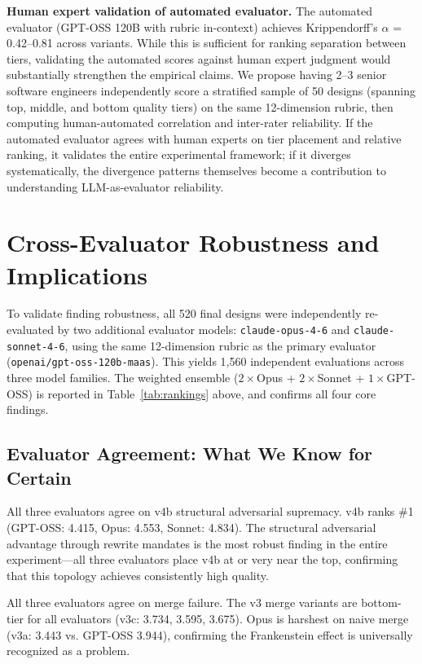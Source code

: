 \documentclass[conference]{IEEEtran}
\begin{document}
\textbf{Human expert validation of automated evaluator.} The automated evaluator (GPT-OSS 120B with rubric in-context) achieves Krippendorff's $\alpha$ = 0.42--0.81 across variants. While this is sufficient for ranking separation between tiers, validating the automated scores against human expert judgment would substantially strengthen the empirical claims. We propose having 2--3 senior software engineers independently score a stratified sample of 50 designs (spanning top, middle, and bottom quality tiers) on the same 12-dimension rubric, then computing human-automated correlation and inter-rater reliability. If the automated evaluator agrees with human experts on tier placement and relative ranking, it validates the entire experimental framework; if it diverges systematically, the divergence patterns themselves become a contribution to understanding LLM-as-evaluator reliability.
\section{Cross-Evaluator Robustness and Implications}
To validate finding robustness, all 520 final designs were independently re-evaluated by two additional evaluator models: \texttt{claude-opus-4-6} and \texttt{claude-sonnet-4-6}, using the same 12-dimension rubric as the primary evaluator (\texttt{openai/gpt-oss-120b-maas}). This yields 1,560 independent evaluations across three model families. The weighted ensemble ($2\times$Opus + $2\times$Sonnet + $1\times$GPT-OSS) is reported in Table~\ref{tab:rankings} above, and confirms all four core findings.

\subsection{Evaluator Agreement: What We Know for Certain}
All three evaluators agree on v4b structural adversarial supremacy. v4b ranks \#1 (GPT-OSS: 4.415, Opus: 4.553, Sonnet: 4.834). The structural adversarial advantage through rewrite mandates is the most robust finding in the entire experiment---all three evaluators place v4b at or very near the top, confirming that this topology achieves consistently high quality.

All three evaluators agree on merge failure. The v3 merge variants are bottom-tier for all evaluators (v3c: 3.734, 3.595, 3.675). Opus is harshest on naive merge (v3a: 3.443 vs. GPT-OSS 3.944), confirming the Frankenstein effect is universally recognized as a problem.
\end{document}
